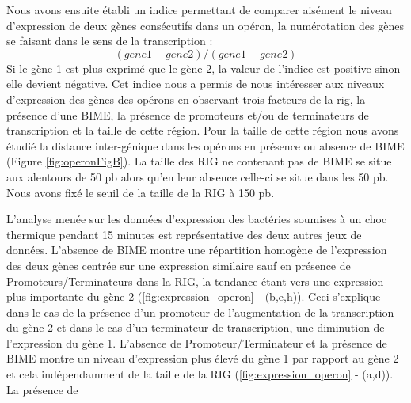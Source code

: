 \documentclass[12pt,a4paper]{report}
\begin{document}
\begin{onehalfspace}
Nous avons ensuite établi un indice permettant de comparer aisément le niveau d'expression de deux gènes consécutifs dans un opéron, la numérotation des gènes se faisant dans le sens de la transcription :
\[ (gene1 - gene2) / (gene1 + gene2) \]
Si le gène 1 est plus exprimé que le gène 2, la valeur de l'indice est positive sinon elle devient négative. Cet indice nous a permis de nous intéresser aux niveaux d'expression des gènes des opérons en observant trois facteurs de la \gls{rig}, la présence d'une BIME, la présence de promoteurs et/ou de terminateurs de transcription et la taille de cette région. Pour la taille de cette région nous avons étudié la distance inter-génique dans les opérons en présence ou absence de BIME (Figure \autoref{fig:operonFigB}). La taille des RIG ne contenant pas de BIME se situe aux alentours de 50 pb alors qu'en leur absence celle-ci se situe dans les 50 pb. Nous avons fixé le seuil de la taille de la RIG à 150 pb.

L'analyse menée sur les données d'expression des bactéries soumises à un choc thermique pendant 15 minutes est représentative des deux autres jeux de données. L'absence de BIME montre une répartition homogène de l'expression des deux gènes centrée sur une expression similaire sauf en présence de Promoteurs/Terminateurs dans la RIG, la tendance étant vers une expression plus importante du gène 2 (\autoref{fig:expression_operon} - (b,e,h)). Ceci s'explique dans le cas de la présence d'un promoteur de l'augmentation de la transcription du gène 2 et dans le cas d'un terminateur de transcription, une diminution de l'expression du gène 1.
L'absence de Promoteur/Terminateur et la présence de BIME montre un niveau d'expression plus élevé du gène 1 par rapport au gène 2 et cela indépendamment de la taille de la RIG (\autoref{fig:expression_operon} - (a,d)). La présence de



\end{onehalfspace}
\end{document}
